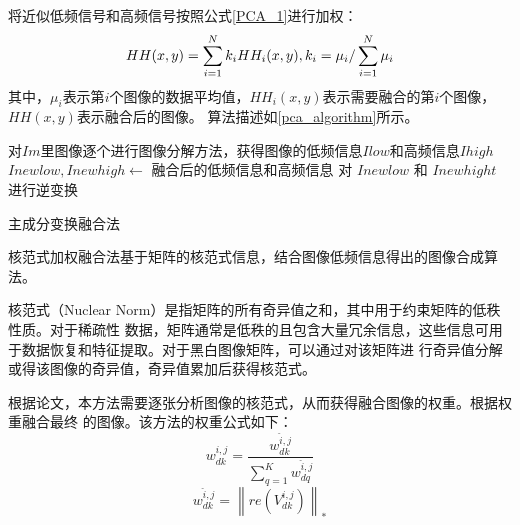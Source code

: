\documentclass{xduugthesis}
\begin{document}
将近似低频信号和高频信号按照公式\ref{PCA_1}进行加权：
\begin{equation}
	HH(x,y)=\sum_{i=1}^{N}k_iHH_i(x,y),\space k_i=\mu_i/\sum_{i=1}^{N}\mu_i
	\label{PCA_1}
\end{equation}
其中，$\mu_i$表示第$i$个图像的数据平均值，$HH_i(x,y)$表示需要融合的第$i$个图像，$HH(x,y)$表示融合后的图像。
算法描述如\ref{pca_algorithm}所示。\par
\IncMargin{2em}
\begin{algorithm}[H]
	对$Im$里图像逐个进行图像分解方法，获得图像的低频信息$Ilow$和高频信息$Ihigh$\;
	$Inewlow, Inewhigh\leftarrow$ 融合后的低频信息和高频信息\;
	对 $Inewlow$ 和 $Inewhight$ 进行逆变换\;
	\caption{主成分变换融合法}\label{pca_algorithm}
\end{algorithm}
\DecMargin{2em}
核范式加权融合法基于矩阵的核范式信息，结合图像低频信息得出的图像合成算法。\par
核范式（Nuclear Norm）是指矩阵的所有奇异值之和，其中用于约束矩阵的低秩性质\cite{Nuclear_Norm}。对于稀疏性
数据，矩阵通常是低秩的且包含大量冗余信息，这些信息可用于数据恢复和特征提取。对于黑白图像矩阵，可以通过对该矩阵进
行奇异值分解或得该图像的奇异值，奇异值累加后获得核范式。\par
根据论文\parencite{Softmax_Merge}，本方法需要逐张分析图像的核范式，从而获得融合图像的权重。根据权重融合最终
的图像。该方法的权重公式如下：
\begin{equation}w_{dk}^{i,j}=\frac{w_{dk}^{\hat{i},j}}{\sum_{q=1}^{K}w_{dq}^{\hat{i},j}}\end{equation}
\begin{equation}w_{dk}^{\hat{i},j}={\left\| re\left(V_{dk}^{i,j}\right)\right\|}_*\end{equation}
\end{document}

